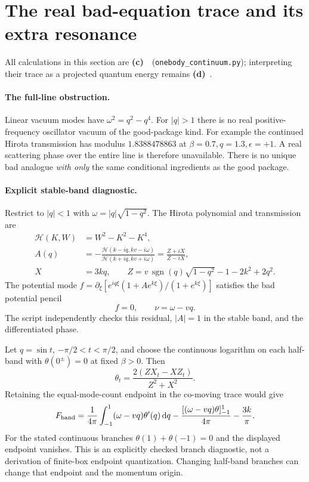 \documentclass[11pt,a4paper]{article}
\newcommand{\Lc}{\textbf{(c)}\ }
\newcommand{\Ld}{\textbf{(d)}\ }
\newcommand{\dd}{\mathrm d}
\newcommand{\CC}{\texttt{onebody\_\allowbreak continuum.py}}
\begin{document}
\section{The real bad-equation trace and its extra resonance}
All calculations in this section are \Lc\ (\CC); interpreting their trace
as a projected quantum energy remains \Ld.

\paragraph{The full-line obstruction.}
Linear vacuum modes have $\omega^2=q^2-q^4$. For $|q|>1$ there is no real
positive-frequency oscillator vacuum of the good-package kind.
For example the continued Hirota transmission has modulus
$1.8388478863$ at $\beta=0.7,q=1.3,\epsilon=+1$.
A real scattering phase over the entire line is therefore unavailable.
There is no unique bad analogue \emph{with only} the same conditional
ingredients as the good package.

\paragraph{Explicit stable-band diagnostic.}
Restrict to $|q|<1$ with $\omega=|q|\sqrt{1-q^2}$.
The Hirota polynomial and transmission are
\begin{align}
 \mathcal H(K,W)&=W^2-K^2-K^4,\\
 A(q)&=-\frac{\mathcal H(k-iq,kv-i\omega)}
                    {\mathcal H(k+iq,kv+i\omega)}
       =\frac{Z+iX}{Z-iX},\\
 X&=3kq,\qquad
 Z=v\,\operatorname{sgn}(q)\sqrt{1-q^2}-1-2k^2+2q^2.
 \label{eq:A}
\end{align}
The potential mode $f=\partial_\xi[e^{iq\xi}(1+Ae^{k\xi})/(1+e^{k\xi})]$
satisfies the bad potential pencil
\begin{equation}
 [-\partial_\xi^4+(v^2-1)\partial_\xi^2
       -6\partial_\xi(u_0\partial_\xi)
       +2iv\nu\partial_\xi-\nu^2]f=0,
 \qquad \nu=\omega-vq.
\end{equation}
The script independently checks this residual, $|A|=1$ in the stable band,
and the differentiated phase.

Let $q=\sin t$, $-\pi/2<t<\pi/2$, and choose the continuous logarithm on
each half-band with $\theta(0^\pm)=0$ at fixed $\beta>0$. Then
\begin{equation}
 \theta_t=\frac{2(ZX_t-XZ_t)}{Z^2+X^2}.
\end{equation}
Retaining the equal-mode-count endpoint in the co-moving trace would give
\begin{equation}
 F_{\rm band}=\frac1{4\pi}\int_{-1}^{1}(\omega-vq)\theta'(q)\,\dd q
       -\frac{[(\omega-vq)\theta]_{-1}^{1}}{4\pi}
       -\frac{3k}{\pi}. \label{eq:bandtrace}
\end{equation}
For the stated continuous branches $\theta(1)+\theta(-1)=0$ and the
displayed endpoint vanishes. This is an explicitly checked branch diagnostic,
not a derivation of finite-box endpoint quantization. Changing half-band
branches can change that endpoint and the momentum origin.
\end{document}

